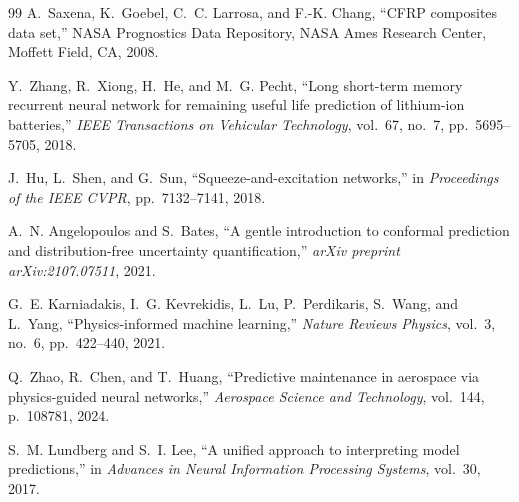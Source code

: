 \documentclass[conference]{IEEEtran}
\begin{document}
\begin{thebibliography}{99}
A.~Saxena, K.~Goebel, C.~C. Larrosa, and F.-K. Chang, ``CFRP composites data set,'' NASA Prognostics Data Repository, NASA Ames Research Center, Moffett Field, CA, 2008.

Y.~Zhang, R.~Xiong, H.~He, and M.~G. Pecht, ``Long short-term memory recurrent neural network for remaining useful life prediction of lithium-ion batteries,'' \emph{IEEE Transactions on Vehicular Technology}, vol.~67, no.~7, pp.~5695--5705, 2018.

J.~Hu, L.~Shen, and G.~Sun, ``Squeeze-and-excitation networks,'' in \emph{Proceedings of the IEEE CVPR}, pp.~7132--7141, 2018.

A.~N. Angelopoulos and S.~Bates, ``A gentle introduction to conformal prediction and distribution-free uncertainty quantification,'' \emph{arXiv preprint arXiv:2107.07511}, 2021.

G.~E. Karniadakis, I.~G. Kevrekidis, L.~Lu, P.~Perdikaris, S.~Wang, and L.~Yang, ``Physics-informed machine learning,'' \emph{Nature Reviews Physics}, vol.~3, no.~6, pp.~422--440, 2021.

Q.~Zhao, R.~Chen, and T.~Huang, ``Predictive maintenance in aerospace via physics-guided neural networks,'' \emph{Aerospace Science and Technology}, vol.~144, p.~108781, 2024.

S.~M. Lundberg and S.~I. Lee, ``A unified approach to interpreting model predictions,'' in \emph{Advances in Neural Information Processing Systems}, vol.~30, 2017.

\end{thebibliography}
\end{document}
